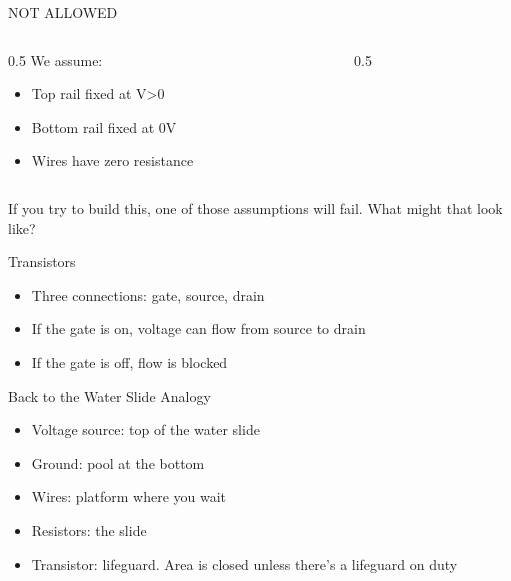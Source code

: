 \begin{frame}{NOT ALLOWED}
	\begin{columns}
		\begin{column}{0.5\textwidth}
			We assume:
			\begin{itemize}
				\item Top rail fixed at V>0
				\item Bottom rail fixed at 0V
				\item Wires have zero resistance
			\end{itemize}
		\end{column}
		\begin{column}{0.5\textwidth}
					\end{column}
	\end{columns}

	If you try to build this, one of those assumptions will fail. What might that look like?

\end{frame}


\begin{frame}{Transistors}
	\begin{itemize}
		\item Three connections: gate, source, drain
		\item If the gate is on, voltage can flow from source to drain
		\item If the gate is off, flow is blocked
	\end{itemize}
\end{frame}


\begin{frame}{Back to the Water Slide Analogy}
	\begin{itemize}
		\item Voltage source: top of the water slide
		\item Ground: pool at the bottom
		\item Wires: platform where you wait
		\item Resistors: the slide
		\item Transistor: lifeguard. Area is closed unless there's a lifeguard on duty
	\end{itemize}
\end{frame}


